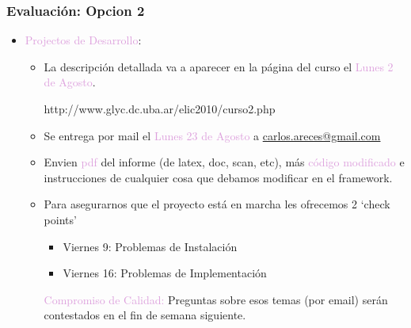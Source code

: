 \documentclass[compress,color=usenames]{beamer}
\newcommand{\mH}[1]{\textcolor{Plum}{#1}}
\begin{document}
\begin{frame}
\frametitle{Evaluaci\'on: Opcion 2}


\begin{itemize}
\item \mH{Projectos de Desarrollo}: 
\begin{itemize}
\item La descripci\'on detallada va a aparecer en la p\'agina del curso el \mH{Lunes 2 de Agosto}. 
\medskip

\centerline{http://www.glyc.dc.uba.ar/elic2010/curso2.php}
\medskip

\item Se entrega por mail el \mH{Lunes 23 de Agosto} a \url{carlos.areces@gmail.com}

\item Envien \mH{pdf} del informe (de latex, doc, scan, etc), m\'as \mH{c\'odigo modificado} e 
instrucciones de cualquier cosa que debamos modificar en el framework.\pause  

\item Para asegurarnos que el proyecto est\'a en marcha les ofrecemos 2 `check points'
\begin{itemize}
  \item Viernes 9: Problemas de Instalaci\'on
  \item Viernes 16: Problemas de Implementaci\'on
\end{itemize}

\mH{Compromiso de Calidad:} Preguntas sobre esos temas (por email) ser\'an contestados en el fin 
de semana siguiente. 

\end{itemize}
\end{itemize}
\end{frame}
\end{document}
